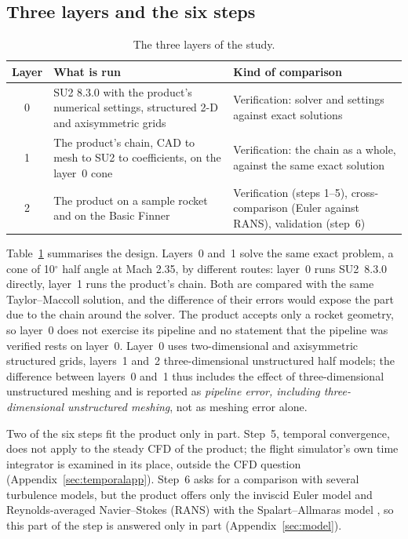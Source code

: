 \documentclass[twocolumn]{labreport}
\begin{document}
\subsection{Three layers and the six steps}
\label{sec:layers}

\begin{table}[b]
\centering
\caption{The three layers of the study.}
\label{tab:layers}
\small
\begin{tabular}{@{}cp{3.2cm}p{3.4cm}@{}}
\toprule
Layer & What is run & Kind of comparison \\
\midrule
0 & SU2 8.3.0 with the product's numerical settings, structured 2-D and axisymmetric grids
  & Verification: solver and settings against exact solutions \\
1 & The product's chain, CAD to mesh to SU2 to coefficients, on the layer~0 cone
  & Verification: the chain as a whole, against the same exact solution \\
2 & The product on a sample rocket and on the Basic Finner
  & Verification (steps 1--5), cross-comparison (Euler against RANS), validation (step~6) \\
\bottomrule
\end{tabular}
\end{table}

Table~\ref{tab:layers} summarises the design.
Layers~0 and~1 solve the same exact problem, a cone of 10$^\circ$ half angle at Mach 2.35, by different routes: layer~0 runs SU2~8.3.0 directly, layer~1 runs the product's chain.
Both are compared with the same Taylor--Maccoll solution, and the difference of their errors would expose the part due to the chain around the solver.
The product accepts only a rocket geometry, so layer~0 does not exercise its pipeline and no statement that the pipeline was verified rests on layer~0.
Layer~0 uses two-dimensional and axisymmetric structured grids, layers~1 and~2 three-dimensional unstructured half models; the difference between layers~0 and~1 thus includes the effect of three-dimensional unstructured meshing and is reported as \emph{pipeline error, including three-dimensional unstructured meshing}, not as meshing error alone.

Two of the six steps fit the product only in part.
Step~5, temporal convergence, does not apply to the steady CFD of the product; the flight simulator's own time integrator is examined in its place, outside the CFD question (Appendix~\ref{sec:temporalapp}).
Step~6 asks for a comparison with several turbulence models, but the product offers only the inviscid Euler model and Reynolds-averaged Navier--Stokes (RANS) with the Spalart--Allmaras model \citep{spalart1992}, so this part of the step is answered only in part (Appendix~\ref{sec:model}).
\end{document}
